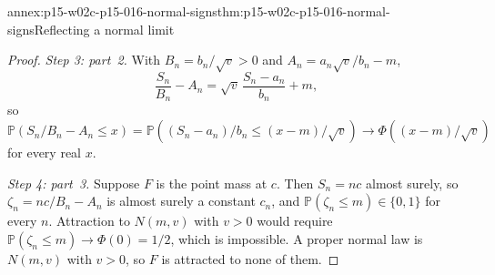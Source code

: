 \begin{annexitem}{annex:p15-w02c-p15-016-normal-signs}{thm:p15-w02c-p15-016-normal-signs}{Reflecting a normal limit}
\begin{proof}
\emph{Step 3: part~2.} With \(B_n=b_n/\sqrt v>0\) and
\(A_n=a_n\sqrt v/b_n-m\),
\[
 \frac{S_n}{B_n}-A_n=\sqrt v\,\frac{S_n-a_n}{b_n}+m ,
\]
so \(\mathbb P(S_n/B_n-A_n\leq x)
=\mathbb P((S_n-a_n)/b_n\leq(x-m)/\sqrt v)\to\Phi((x-m)/\sqrt v)\)
for every real \(x\).

\emph{Step 4: part~3.} Suppose \(F\) is the point mass at \(c\). Then
\(S_n=nc\) almost surely, so \(\zeta_n=nc/B_n-A_n\) is almost surely a
constant \(c_n\), and \(\mathbb P(\zeta_n\leq m)\in\{0,1\}\) for every
\(n\). Attraction to \(N(m,v)\) with \(v>0\) would require
\(\mathbb P(\zeta_n\leq m)\to\Phi(0)=1/2\), which is impossible. A
proper normal law is \(N(m,v)\) with \(v>0\), so \(F\) is attracted
to none of them.
\end{proof}
\end{annexitem}

